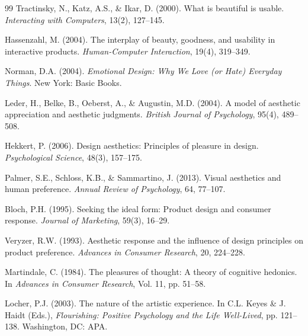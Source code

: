 \documentclass[10pt,a4paper]{article}
\begin{document}
\begin{thebibliography}{99}
 Tractinsky, N., Katz, A.S., \& Ikar, D. (2000). What is beautiful is usable. \textit{Interacting with Computers}, 13(2), 127--145.

 Hassenzahl, M. (2004). The interplay of beauty, goodness, and usability in interactive products. \textit{Human-Computer Interaction}, 19(4), 319--349.

 Norman, D.A. (2004). \textit{Emotional Design: Why We Love (or Hate) Everyday Things}. New York: Basic Books.

 Leder, H., Belke, B., Oeberst, A., \& Augustin, M.D. (2004). A model of aesthetic appreciation and aesthetic judgments. \textit{British Journal of Psychology}, 95(4), 489--508.

 Hekkert, P. (2006). Design aesthetics: Principles of pleasure in design. \textit{Psychological Science}, 48(3), 157--175.

 Palmer, S.E., Schloss, K.B., \& Sammartino, J. (2013). Visual aesthetics and human preference. \textit{Annual Review of Psychology}, 64, 77--107.

 Bloch, P.H. (1995). Seeking the ideal form: Product design and consumer response. \textit{Journal of Marketing}, 59(3), 16--29.

 Veryzer, R.W. (1993). Aesthetic response and the influence of design principles on product preference. \textit{Advances in Consumer Research}, 20, 224--228.

 Martindale, C. (1984). The pleasures of thought: A theory of cognitive hedonics. In \textit{Advances in Consumer Research}, Vol. 11, pp. 51--58.

 Locher, P.J. (2003). The nature of the artistic experience. In C.L. Keyes \& J. Haidt (Eds.), \textit{Flourishing: Positive Psychology and the Life Well-Lived}, pp. 121--138. Washington, DC: APA.

\end{thebibliography}
\end{document}
